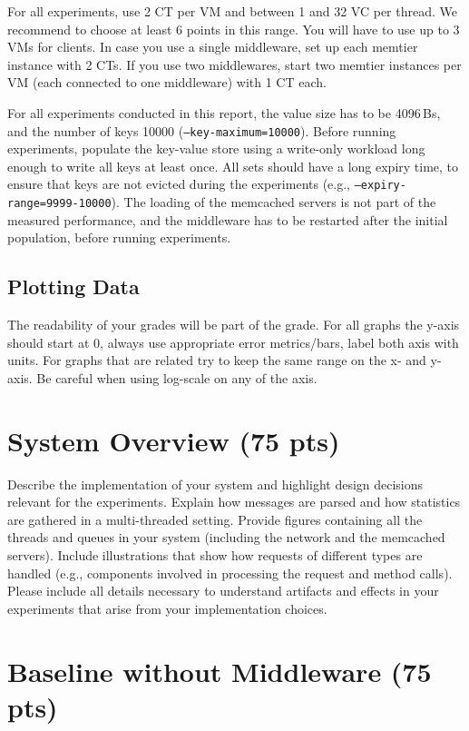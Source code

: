 \documentclass[11pt,a4paper]{article}
\begin{document}
For all experiments, use 2 CT per VM and between 1 and 32 VC per thread. We recommend to choose at least 6 points in this range. You will have to use up to 3 VMs for clients. In case you use a single middleware, set up each memtier instance with 2 CTs. If you use two middlewares, start two memtier instances per VM (each connected to one middleware) with 1 CT each.

For all experiments conducted in this report, the value size has to be 4096\,Bs, and the number of keys 10000 (\texttt{--key-maximum=10000}). Before running experiments, populate the key-value store using a write-only workload long enough to write all keys at least once. All sets should have a long expiry time, to ensure that keys are not evicted during the experiments (e.g., \texttt{--expiry-range=9999-10000}). The loading of the memcached servers is not part of the measured performance, and the middleware has to be restarted after the initial population, before running experiments. 

\subsection*{Plotting Data}
The readability of your grades will be part of the grade. For all graphs the y-axis should start at 0, always use appropriate error metrics/bars, label both axis with units. For graphs that are related try to keep the same range on the x- and y-axis. Be careful when using log-scale on any of the axis. 
\newpage

\section{System Overview (75 pts)}

Describe the implementation of your system and highlight design decisions relevant for the experiments. Explain how messages are parsed and how statistics are gathered in a multi-threaded setting. Provide figures containing all the threads and queues in your system (including the network and the memcached servers). Include illustrations that show how requests of different types are handled (e.g., components involved in processing the request and method calls). Please include all details necessary to understand artifacts and effects in your experiments that arise from your implementation choices.

\section{Baseline without Middleware (75 pts)}
\end{document}
